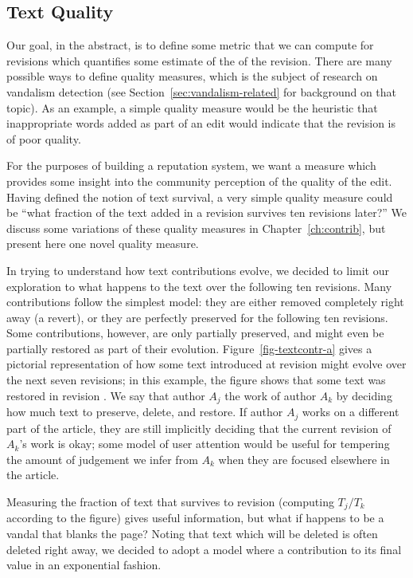 \subsection{Text Quality}

Our goal, in the abstract, is to define some metric that we can compute for
revisions which quantifies some estimate of the  of the
revision.
There are many possible ways to define quality measures, which is the
subject of research on vandalism detection (see
Section~\ref{sec:vandalism-related} for background on that topic).
As an example, a simple quality measure would be the heuristic that
inappropriate words added as part of an edit would indicate that the revision
is of poor quality.

For the purposes of building a reputation system, we want a measure
which provides some insight into the community perception of the
quality of the edit.
Having defined the notion of text survival, a very simple quality measure
could be ``what fraction of the text added in a revision survives
ten revisions later?''
We discuss some variations of these quality measures in
Chapter~\ref{ch:contrib}, but present here one novel quality measure.

In trying to understand how text contributions evolve, we decided
to limit our exploration to what happens to the text over the
following ten revisions.
Many contributions follow the simplest model: they are either
removed completely right away (a revert), or they are perfectly
preserved for the following ten revisions.
Some contributions, however, are only partially preserved, and
might even be partially restored as part of their evolution.
Figure~\ref{fig-textcontr-a} gives a pictorial representation
of how some text introduced at revision  might
evolve over the next seven revisions; in this example, the
figure shows that some text was restored in revision .
We say that author $A_j$  the work of author
$A_k$ by deciding how much text to preserve, delete, and restore.
If author $A_j$ works on a different part of the article, they
are still implicitly deciding that the current revision of
$A_k$'s work is okay; some model of user attention would be
useful for tempering the amount of judgement we infer from
$A_k$ when they are focused elsewhere in the article.

Measuring the fraction of text that survives to revision 
(\eg computing $T_j / T_k$ according to the figure)
gives useful information, but what if  happens to be
a vandal that blanks the page?
Noting that text which will be deleted is often deleted right away,
we decided to adopt a model where a contribution 
to its final value in an exponential fashion.



